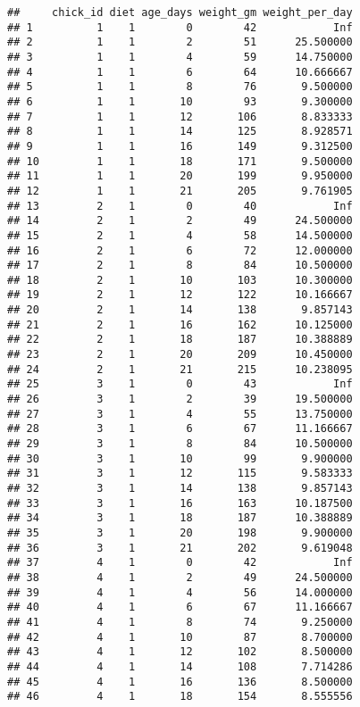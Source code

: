 \documentclass[
]{article}
\begin{document}
\begin{verbatim}
##     chick_id diet age_days weight_gm weight_per_day
## 1          1    1        0        42            Inf
## 2          1    1        2        51      25.500000
## 3          1    1        4        59      14.750000
## 4          1    1        6        64      10.666667
## 5          1    1        8        76       9.500000
## 6          1    1       10        93       9.300000
## 7          1    1       12       106       8.833333
## 8          1    1       14       125       8.928571
## 9          1    1       16       149       9.312500
## 10         1    1       18       171       9.500000
## 11         1    1       20       199       9.950000
## 12         1    1       21       205       9.761905
## 13         2    1        0        40            Inf
## 14         2    1        2        49      24.500000
## 15         2    1        4        58      14.500000
## 16         2    1        6        72      12.000000
## 17         2    1        8        84      10.500000
## 18         2    1       10       103      10.300000
## 19         2    1       12       122      10.166667
## 20         2    1       14       138       9.857143
## 21         2    1       16       162      10.125000
## 22         2    1       18       187      10.388889
## 23         2    1       20       209      10.450000
## 24         2    1       21       215      10.238095
## 25         3    1        0        43            Inf
## 26         3    1        2        39      19.500000
## 27         3    1        4        55      13.750000
## 28         3    1        6        67      11.166667
## 29         3    1        8        84      10.500000
## 30         3    1       10        99       9.900000
## 31         3    1       12       115       9.583333
## 32         3    1       14       138       9.857143
## 33         3    1       16       163      10.187500
## 34         3    1       18       187      10.388889
## 35         3    1       20       198       9.900000
## 36         3    1       21       202       9.619048
## 37         4    1        0        42            Inf
## 38         4    1        2        49      24.500000
## 39         4    1        4        56      14.000000
## 40         4    1        6        67      11.166667
## 41         4    1        8        74       9.250000
## 42         4    1       10        87       8.700000
## 43         4    1       12       102       8.500000
## 44         4    1       14       108       7.714286
## 45         4    1       16       136       8.500000
## 46         4    1       18       154       8.555556

\end{verbatim}
\end{document}
